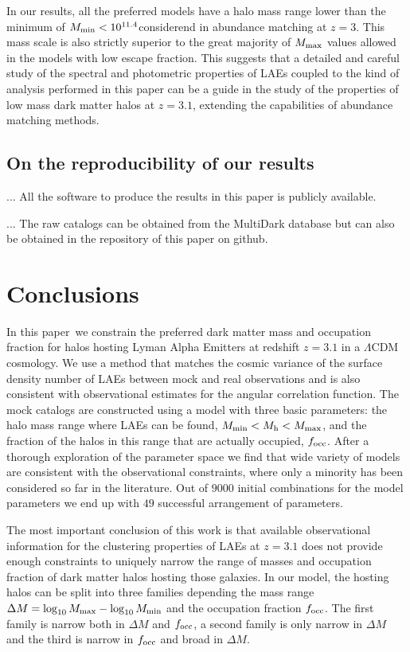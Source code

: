 \documentclass[usenatbib]{mn2e}
\newcommand{\documentname}{paper~}
\newcommand{\hMsun}{{\ifmmode{h^{-1}{\rm
        {M_{\odot}}}}\else{$h^{-1}{\rm{M_{\odot}}}$}\fi}}
\begin{document}
In our results, all the preferred models have a halo mass range lower
than the minimum of $M_{\rm min}<10^{11.4}$\hMsun considerend in
abundance matching at $z=3$. This mass scale is also strictly superior to
the great majority of  $M_{\rm max}$ values allowed in the models with
low escape fraction.   This suggests that a detailed and careful study
of the spectral and photometric properties of LAEs coupled to the kind
of analysis performed in this paper can be a guide in the study of the
properties of low mass dark matter halos at $z=3.1$, extending the
capabilities of abundance matching methods.


\subsection{On the reproducibility of our results}

... All the software to produce the results in this paper is publicly
available. 

... The raw catalogs can be obtained from the MultiDark database but
can also be obtained in the repository of this paper on github.

\section{Conclusions}
\label{sec:conclusions}

In this \documentname we constrain the preferred dark matter mass
and occupation fraction for halos hosting Lyman Alpha Emitters at
redshift $z=3.1$ in a $\Lambda$CDM cosmology. We use a method that
matches the cosmic variance of the surface 
density number of LAEs between mock and real observations and is also
consistent with observational estimates for the angular
correlation function. The mock catalogs are constructed using a 
model with three basic parameters: the halo mass range where LAEs can
be found, $M_{\rm   min}<M_{\rm h}<M_{\rm   max}$, and the fraction of
the halos in this range that are actually occupied, $f_{\rm occ}$. After
a thorough exploration of the parameter space we find that wide
variety of models are consistent with the observational constraints,
where only a minority has been considered so far in the
literature. Out of $9000$ initial combinations for the model
parameters we end up with $49$ successful arrangement of parameters.


The most important conclusion of this work is that available
observational information for the clustering properties of LAEs at
$z=3.1$ does not provide enough constraints to uniquely narrow the range of masses
and occupation fraction of dark matter halos hosting those galaxies. In our
model, the hosting halos can be split into three families depending the mass range
$\Delta M=\log_{10}M_{\rm max} - \log_{10}M_{\rm min}$ and the
occupation fraction $f_{\rm occ}$. The first family is narrow both in
$\Delta M$ and $f_{\rm occ}$, a second family is only narrow in
$\Delta M$ and the third is narrow in $f_{\rm occ}$ and broad in
$\Delta M$. 
\end{document}
